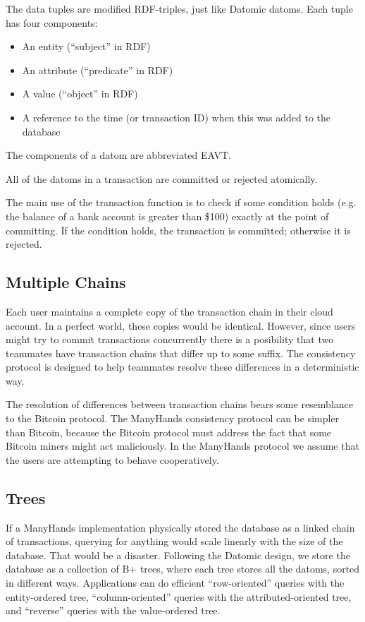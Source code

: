 \documentclass[pldi,10pt]{sigplanconf-pldi16}
\begin{document}
The data tuples are modified RDF-triples, just like Datomic datoms.
Each tuple has four components:

\begin{itemize}
\item An entity (``subject'' in RDF)
\item An attribute (``predicate'' in RDF)
\item A value (``object'' in RDF)
\item A reference to the time (or transaction ID) when this was added to the database
\end{itemize}

The components of a datom are abbreviated EAVT.

All of the datoms in a transaction are committed or rejected atomically.


The main use of the transaction function is to check if some condition holds (e.g. the balance of a bank account is greater than \$100) exactly at the point of committing.
If the condition holds, the transaction is committed; otherwise it is rejected.


\subsection{Multiple Chains}

Each user maintains a complete copy of the transaction chain in their cloud account.
In a perfect world, these copies would be identical.
However, since users might try to commit transactions concurrently there is a posibility that two teammates have transaction chains that differ up to some suffix.
The consistency protocol is designed to help teammates resolve these differences in a deterministic way.

The resolution of differences between transaction chains bears some resemblance to the Bitcoin protocol.
The ManyHands consistency protocol can be simpler than Bitcoin, because the Bitcoin protocol must address the fact that some Bitcoin miners might act maliciously.
In the ManyHands protocol we assume that the users are attempting to behave cooperatively.

\subsection{Trees}

If a ManyHands implementation physically stored the database as a linked chain of transactions, querying for anything would scale linearly with the size of the database.
That would be a disaster.
Following the Datomic design, we store the database as a collection of B+ trees, where each tree stores all the datoms, sorted in different ways.
Applications can do efficient ``row-oriented'' queries with the entity-ordered tree, ``column-oriented'' queries with the attributed-oriented tree, and ``reverse'' queries with the value-ordered tree.
\end{document}
